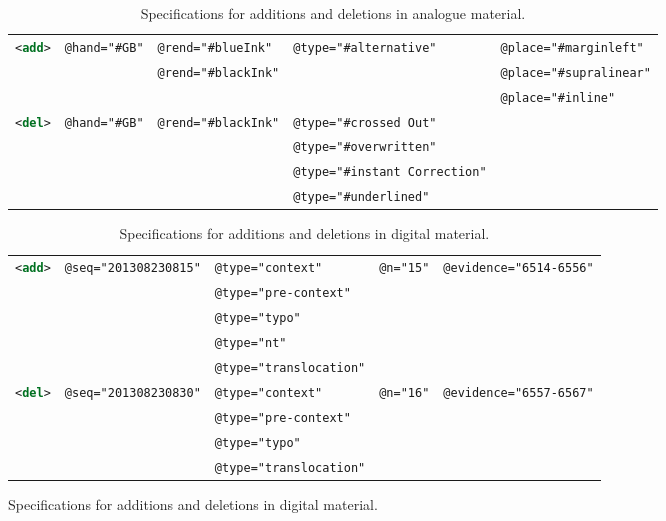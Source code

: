 \begin{paper}
\begin{figure}[H]
\centering\tiny\renewcommand{\arraystretch}{1.5}
\begin{longtable}[]{@{}p{}|p{}|p{}|p{}|p{}@{}}
\caption{Specifications for additions and deletions in analogue
material.\label{tab:bekius:encodinganalogue}} \\
\toprule
\lstinline[language=XML]!<add>!	& \lstinline[language=XML]!@hand="#GB"!	& \lstinline[language=XML]!@rend="#blueInk"!	& \lstinline[language=XML]!@type="#alternative"!	& \lstinline[language=XML]!@place="#marginleft"! \tabularnewline
& & \lstinline[language=XML]!@rend="#blackInk"! & & \lstinline[language=XML]!@place="#supralinear"! \tabularnewline
& & & & \lstinline[language=XML]!@place="#inline"! \tabularnewline\hline
\lstinline[language=XML]!<del>!	& \lstinline[language=XML]!@hand="#GB"!	& \lstinline[language=XML]!@rend="#blackInk"!	& \lstinline[language=XML]!@type="#crossed Out"! & \tabularnewline
& & & \lstinline[language=XML]!@type="#overwritten"! & \tabularnewline
& & & \lstinline[language=XML]!@type="#instant Correction"! & \tabularnewline
& & & \lstinline[language=XML]!@type="#underlined"! & \tabularnewline
\bottomrule
\end{longtable}

\centering\tiny\renewcommand{\arraystretch}{1.5}
\begin{longtable}[]{@{}p{}|p{}|p{}|p{}|p{}@{}}
\caption{Specifications for additions and deletions in digital material.\label{tab:bekius:encodingdigital}} \\
\toprule

\lstinline[language=XML]!<add>! &	
\lstinline[language=XML]!@seq="201308230815"!	&
\lstinline[language=XML]!@type="context"! &
\lstinline[language=XML]!@n="15"! &
\lstinline[language=XML]!@evidence="6514-6556"! \tabularnewline
& & \lstinline[language=XML]!@type="pre-context"! & & \tabularnewline
& & \lstinline[language=XML]!@type="typo"! & & \tabularnewline
& & \lstinline[language=XML]!@type="nt"! & & \tabularnewline
& & \lstinline[language=XML]!@type="translocation"! & & \tabularnewline 

\hline	

\lstinline[language=XML]!<del>!	& 
\lstinline[language=XML]!@seq="201308230830"!	& 
\lstinline[language=XML]!@type="context"! & 
\lstinline[language=XML]!@n="16"! &
\lstinline[language=XML]!@evidence="6557-6567"! \tabularnewline
& & \lstinline[language=XML]!@type="pre-context"! & & \tabularnewline
& & \lstinline[language=XML]!@type="typo"! & & \tabularnewline
& & \lstinline[language=XML]!@type="translocation"! & & \tabularnewline


\end{longtable}
\end{figure}
\end{paper}
